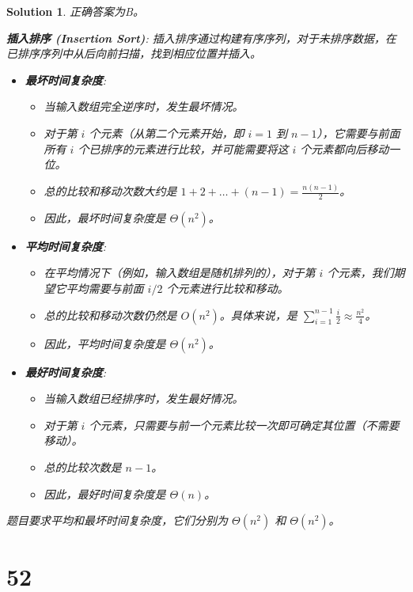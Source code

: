 \documentclass[UTF8]{report}
\newtheorem{solution}{Solution}
\theoremstyle{MyLineTheoremStyle} %
\theoremstyle{MyBlockTheoremStyle} %
\theoremstyle{MySubsubsectionStyle} %
\begin{document}
\begin{solution}
正确答案为B。

\textbf{插入排序 (Insertion Sort)}:
插入排序通过构建有序序列，对于未排序数据，在已排序序列中从后向前扫描，找到相应位置并插入。

\begin{itemize}
    \item \textbf{最坏时间复杂度}:
    \begin{itemize}
        \item 当输入数组完全逆序时，发生最坏情况。
        \item 对于第 $i$ 个元素（从第二个元素开始，即 $i=1$ 到 $n-1$），它需要与前面所有 $i$ 个已排序的元素进行比较，并可能需要将这 $i$ 个元素都向后移动一位。
        \item 总的比较和移动次数大约是 $1 + 2 + \ldots + (n-1) = \frac{n(n-1)}{2}$。
        \item 因此，最坏时间复杂度是 $\Theta(n^2)$。
    \end{itemize}

    \item \textbf{平均时间复杂度}:
    \begin{itemize}
        \item 在平均情况下（例如，输入数组是随机排列的），对于第 $i$ 个元素，我们期望它平均需要与前面 $i/2$ 个元素进行比较和移动。
        \item 总的比较和移动次数仍然是 $O(n^2)$。具体来说，是 $\sum_{i=1}^{n-1} \frac{i}{2} \approx \frac{n^2}{4}$。
        \item 因此，平均时间复杂度是 $\Theta(n^2)$。
    \end{itemize}

    \item \textbf{最好时间复杂度}:
    \begin{itemize}
        \item 当输入数组已经排序时，发生最好情况。
        \item 对于第 $i$ 个元素，只需要与前一个元素比较一次即可确定其位置（不需要移动）。
        \item 总的比较次数是 $n-1$。
        \item 因此，最好时间复杂度是 $\Theta(n)$。
    \end{itemize}
\end{itemize}
题目要求平均和最坏时间复杂度，它们分别为 $\Theta(n^2)$ 和 $\Theta(n^2)$。
\end{solution}


\section*{52}
\end{document}

